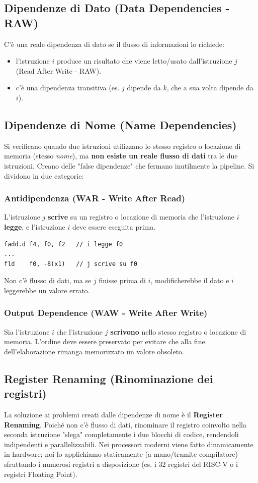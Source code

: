 \subsection{Dipendenze di Dato (Data Dependencies - RAW)}
C'è una reale dipendenza di dato se il flusso di informazioni lo richiede:
\begin{itemize}
    \item l'istruzione $i$ produce un risultato che viene letto/usato dall'istruzione $j$ (Read After Write - RAW).
    \item c'è una dipendenza transitiva (es. $j$ dipende da $k$, che a sua volta dipende da $i$).
\end{itemize}

\subsection{Dipendenze di Nome (Name Dependencies)}
Si verificano quando due istruzioni utilizzano lo stesso registro o locazione di memoria (stesso \textit{nome}), ma \textbf{non esiste un reale flusso di dati} tra le due istruzioni. Creano delle "false dipendenze" che fermano inutilmente la pipeline. Si dividono in due categorie:

\subsubsection{Antidipendenza (WAR - Write After Read)}
L'istruzione $j$ \textbf{scrive} su un registro o locazione di memoria che l'istruzione $i$ \textbf{legge}, e l'istruzione $i$ deve essere eseguita prima.
\begin{example}
\begin{verbatim}
fadd.d f4, f0, f2   // i legge f0
...
fld    f0, -8(x1)   // j scrive su f0
\end{verbatim}
Non c'è flusso di dati, ma se $j$ finisse prima di $i$, modificherebbe il dato e $i$ leggerebbe un valore errato.
\end{example}

\subsubsection{Output Dependence (WAW - Write After Write)}
Sia l'istruzione $i$ che l'istruzione $j$ \textbf{scrivono} nello stesso registro o locazione di memoria. L'ordine deve essere preservato per evitare che alla fine dell'elaborazione rimanga memorizzato un valore obsoleto.

\subsection{Register Renaming (Rinominazione dei registri)}
La soluzione ai problemi creati dalle dipendenze di nome è il \textbf{Register Renaming}. Poiché non c'è flusso di dati, rinominare il registro coinvolto nella seconda istruzione "slega" completamente i due blocchi di codice, rendendoli indipendenti e parallelizzabili.
Nei processori moderni viene fatto dinamicamente in hardware; noi lo applichiamo staticamente (a mano/tramite compilatore) sfruttando i numerosi registri a disposizione (es. i 32 registri del RISC-V o i registri Floating Point).

